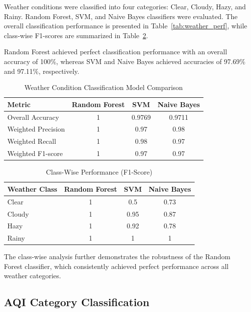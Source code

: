 \documentclass[conference]{IEEEtran}
\begin{document}
Weather conditions were classified into four categories: Clear, Cloudy, Hazy, and Rainy. Random Forest, SVM, and Naive Bayes classifiers were evaluated. The overall classification performance is presented in Table~\ref{tab:weather_perf}, while class-wise F1-scores are summarized in Table~\ref{tab:weather_f1}.

Random Forest achieved perfect classification performance with an overall accuracy of 100\%, whereas SVM and Naive Bayes achieved accuracies of 97.69\% and 97.11\%, respectively.

\begin{table}[ht]
\centering
\caption{Weather Condition Classification Model Comparison}
\label{tab:weather_perf}
\footnotesize
\begin{tabular}{|p{2.3cm}|c|c|c|}
\hline
\textbf{Metric} &
\textbf{Random Forest} &
\textbf{SVM} &
\textbf{Naive Bayes} \\
\hline
Overall Accuracy &
1 &
0.9769 &
0.9711 \\
\hline
Weighted Precision &
1 &
0.97 &
0.98 \\
\hline
Weighted Recall &
1 &
0.98 &
0.97 \\
\hline
Weighted F1-score &
1 &
0.97 &
0.97 \\
\hline
\end{tabular}
\label{tab:weather_classification}
\end{table}

\begin{table}[ht]
\centering
\caption{Class-Wise Performance (F1-Score)}
\footnotesize
\begin{tabular}{|l|c|c|c|}
\hline
\textbf{Weather Class} &
\textbf{Random Forest} &
\textbf{SVM} &
\textbf{Naive Bayes} \\
\hline
Clear & 1 & 0.5 & 0.73 \\
\hline
Cloudy & 1 & 0.95 & 0.87 \\
\hline
Hazy & 1 & 0.92 & 0.78 \\
\hline
Rainy & 1 & 1 & 1 \\
\hline
\end{tabular}
\label{tab:weather_f1}
\end{table}

The class-wise analysis further demonstrates the robustness of the Random Forest classifier, which consistently achieved perfect performance across all weather categories.

\subsection{AQI Category Classification}
\end{document}
